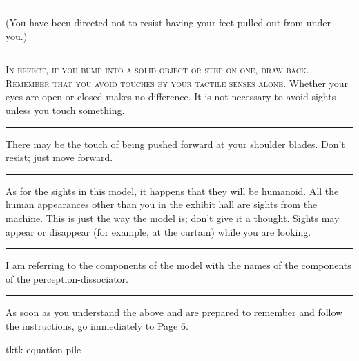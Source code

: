 \plainbreak{2}

(You have been directed not to resist having your 
feet pulled out from under you.) 
\plainbreak{2}

\textsc{In effect, if you bump into a solid object or step on one, draw back. Remember
that you avoid touches by your tactile senses alone.}
Whether your eyes are open or closed makes no difference. It is not necessary to avoid 
sights unless you touch something. 

\plainbreak{2}

There may be the touch of being pushed forward at your shoulder 
blades. Don't resist; just move forward. 

\plainbreak{2}

As for the sights in this model, it happens that they will be humanoid. 
All the human appearances other than you in the exhibit hall are sights from 
the machine. This is just the way the model is; don't give it a thought. Sights 
may appear or disappear (for example, at the curtain) while you are looking. 

\plainbreak{2}

I am referring to the components of the model with the names of the 
components of the perception-dissociator. 

\plainbreak{2}

As soon as you understand the above and are prepared to remember 
and follow the instructions, go immediately to Page 6. 

\vfill 

\clearpage


tktk equation pile

\clearpage

\newcommand{\squat}[1]{
	\ensuremath{#1\frac{1}{2}}}

\newcommand{\eyeO}[1]{
	\ensuremath{#1\wedge}}

\newcommand{\eyeC}[1]{
	\ensuremath{#1\vee}}

\newcommand{\blows}[2]{\ensuremath{#1\equiv#2}}
\newcommand{\pushes}[2]{\ensuremath{#1\sqsupset#2}}

\newcommand\jumpbox[1]{
  \tikz[baseline=(n.base)]{\node(n)[inner sep=1pt]{$#1$};
    \draw[line cap=round](n.south west)--(n.north west)--(n.north east)--(n.south east);
  }
}

\newcommand\tacklebox[1]{
  \tikz[baseline=(n.base)]{\node(n)[inner sep=1pt]{$#1$};
    \draw[line cap=round]
		($ (0, 0.25em) + (n.north) $)
	    -- ($ (0.2em, -0.1em) + (n.south east) $)
	    .. controls ($ (-0.35em,0.1em) + (n.south) $) ..
	    cycle;
  }
}


